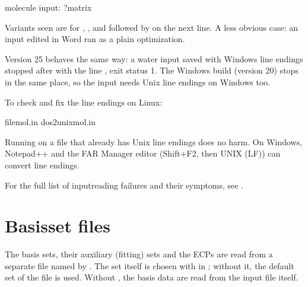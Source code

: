 \documentclass[letterpaper,10pt,english,openany,oneside]{sphinxmanual}
\begin{document}
\begin{sphinxVerbatim}[commandchars=\\\{\}]
 molecule input: \PYGZsq{}\PYGZsq{}
\PYGZsq{} ?matrix
\end{sphinxVerbatim}

\sphinxAtStartPar
Variants seen are  for , , and  followed by  on the next line. A
less obvious case: an input edited in Word ran  as a plain optimization.



\sphinxAtStartPar
Version 25 behaves the same way: a water input saved with Windows line endings stopped after 
with the line , exit status 1. The Windows build  (version 20) stops in the same place, so
the input needs Unix line endings on Windows too. 

\sphinxAtStartPar
To check and fix the line endings on Linux:

\begin{sphinxVerbatim}[commandchars=\\\{\}]
filemol.in
dos2unixmol.in
\end{sphinxVerbatim}

\sphinxAtStartPar
Running  on a file that already has Unix line endings does no harm. On Windows, Notepad++ and the FAR
Manager editor (Shift+F2, then UNIX (LF)) can convert line endings.



\sphinxAtStartPar
For the full list of input\sphinxhyphen{}reading failures and their symptoms, see {\hyperref[\detokenize{troubleshooting/common-problems:troubleshooting-input}]{}}.


\section{Basis\sphinxhyphen{}set files}
\label{\detokenize{start/running:basis-set-files}}
\sphinxAtStartPar
The basis sets, their auxiliary (fitting) sets and the ECPs are read from a separate file named by
{\hyperref[\detokenize{reference/control:control-basis}]{}}. The set itself is chosen with {\hyperref[\detokenize{reference/molecule:molecule-set}]{}} in ; without
it, the default set of the file is used. Without , the basis data are read from the input file itself.
\end{document}
